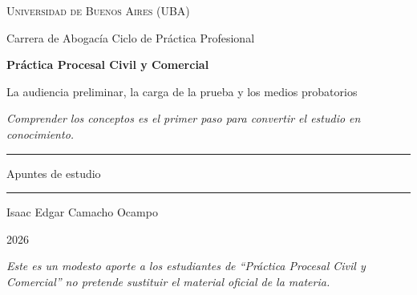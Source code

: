 \documentclass[12pt,oneside]{book}
\newcommand{\universidad}{Universidad de Buenos Aires (UBA)}
\newcommand{\carrera}{Carrera de Abogacía \textperiodcentered{} Ciclo de Práctica Profesional}
\newcommand{\materia}{Práctica Procesal Civil y Comercial}
\newcommand{\titulo}{La audiencia preliminar, la carga de la prueba y los medios probatorios}
\newcommand{\autor}{Isaac Edgar Camacho Ocampo}
\newcommand{\anio}{2026}
\begin{document}
\begin{titlepage}

\thispagestyle{empty}

\begin{center}

\vspace*{1cm}

{\large \textsc{\universidad}}

\vspace{0.2cm}

{\large \carrera}

\vspace{3cm}

{\Huge \textbf{\materia}}

\vspace{1cm}

{\LARGE \titulo}

\vspace{0.8cm}

\textit{Comprender los conceptos es el primer paso para convertir el estudio en conocimiento.}

\vspace{1.2cm}

\rule{0.70\textwidth}{0.5pt}

\vspace{0.5cm}

{\large Apuntes de estudio}

\vspace{0.5cm}

\rule{0.70\textwidth}{0.5pt}

\vfill

{\large \autor}

\vspace{0.3cm}

{\large \anio}

\end{center}

\vfill

\begin{flushleft}
\textit{Este es un modesto aporte a los estudiantes de ``\materia'' no pretende sustituir el material oficial de la materia.}
\end{flushleft}

\end{titlepage}

\tableofcontents
\end{document}
